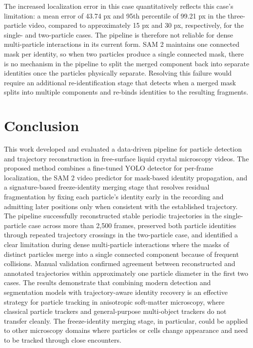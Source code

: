 \documentclass[conference]{IEEEtran}
\begin{document}
The increased localization error in this case quantitatively reflects this case's limitation: a mean error of 43.74 px and 95th percentile of 99.21 px in the three-particle video, compared to approximately 15 px and 30 px, respectively, for the single- and two-particle cases. The pipeline is therefore not reliable for dense multi-particle interactions in its current form. SAM 2 maintains one connected mask per identity, so when two particles produce a single connected mask, there is no mechanism in the pipeline to split the merged component back into separate identities once the particles physically separate. Resolving this failure would require an additional re-identification stage that detects when a merged mask splits into multiple components and re-binds identities to the resulting fragments.


\section{Conclusion}

This work developed and evaluated a data-driven pipeline for particle detection and trajectory reconstruction in free-surface liquid crystal microscopy videos. The proposed method combines a fine-tuned YOLO detector for per-frame localization, the SAM 2 video predictor for mask-based identity propagation, and a signature-based freeze-identity merging stage that resolves residual fragmentation by fixing each particle's identity early in the recording and admitting later positions only when consistent with the established trajectory. The pipeline successfully reconstructed stable periodic trajectories in the single-particle case across more than 2,500 frames, preserved both particle identities through repeated trajectory crossings in the two-particle case, and identified a clear limitation during dense multi-particle interactions where the masks of distinct particles merge into a single connected component because of frequent collisions. Manual validation confirmed agreement between reconstructed and annotated trajectories within approximately one particle diameter in the first two cases. The results demonstrate that combining modern detection and segmentation models with trajectory-aware identity recovery is an effective strategy for particle tracking in anisotropic soft-matter microscopy, where classical particle trackers and general-purpose multi-object trackers do not transfer cleanly. The freeze-identity merging stage, in particular, could be applied to other microscopy domains where particles or cells change appearance and need to be tracked through close encounters.
\end{document}
